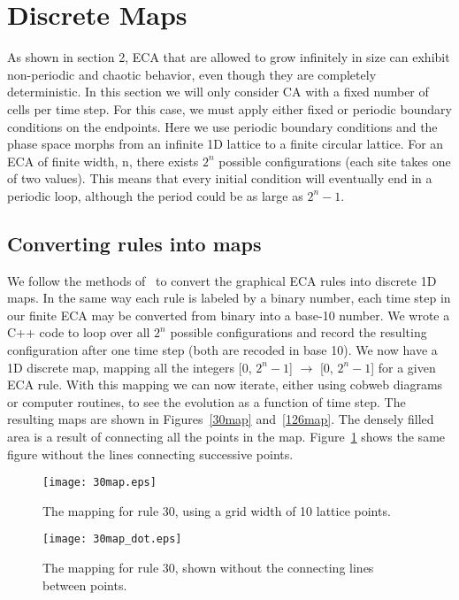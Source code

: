 \section{Discrete Maps}

As shown in section 2, ECA that are allowed to grow infinitely in size can exhibit non-periodic and chaotic behavior, even though they are completely deterministic.   In this section we will only consider CA with a fixed number of cells per time step.  For this case, we must apply either fixed or periodic boundary conditions on the endpoints.  Here we use periodic boundary conditions and the phase space morphs from an infinite 1D lattice to a finite circular lattice.  For an ECA of finite width, n, there exists $2^n$ possible configurations (each site takes one of two values).  This means that every initial condition will eventually end in a periodic loop, although the period could be as large as $2^n -1$.  

\subsection{Converting rules into maps}

We follow the methods of~\cite{sed} to convert the graphical ECA rules into discrete 1D maps.  In the same way each rule is labeled by a binary number, each time step in our finite ECA may be converted from binary into a base-10 number.  We wrote a \textsc{C++} code to loop over all $2^n$ possible configurations and record the resulting configuration after one time step (both are recoded in base 10).  We now have a 1D discrete map, mapping all the integers [0, $2^n -1$] $\rightarrow$ [0, $2^n -1$] for a given ECA rule.  With this mapping we can now iterate, either using cobweb diagrams or computer routines, to see the evolution as a function of time step.  The resulting maps are shown in Figures~\ref{30map} and~\ref{126map}.  The densely filled area is a result of connecting all the points in the map.  Figure~\ref{30map_dot} shows the same figure without the  lines connecting successive points.  

\begin{figure}
    \begin{minipage}[b]{0.49\textwidth}
        \centering
        \texttt{[image: 30map.eps]}
        \caption{\label{30map} The mapping for rule 30, using a grid width of 10 lattice points.  }
    \end{minipage}
    \hspace{0.5cm}
    \begin{minipage}[b]{0.49\textwidth}
        \centering
        \texttt{[image: 30map\_dot.eps]}
        \caption{\label{30map_dot} The mapping for rule 30, shown without the connecting lines between points.}
    \end{minipage}
\end{figure}

